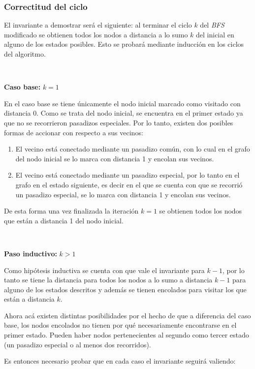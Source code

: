 	\subsubsection*{Correctitud del ciclo}

	El invariante a demostrar será el siguiente: al terminar el ciclo $k$ del
	\emph{BFS} modificado se obtienen todos los nodos a distancia a lo sumo
	$k$ del inicial en alguno de los estados posibles. Esto se probará
	mediante inducción en los ciclos del algoritmo.

	~

	\textbf{Caso base: } $k = 1$

	En el caso base se tiene únicamente el nodo inicial marcado como
	visitado con distancia 0. Como se trata del nodo inicial, se encuentra en el primer estado ya que
	no se recorrieron pasadizos especiales. Por lo tanto, existen dos posibles
	formas de accionar con respecto a sus vecinos:

	\begin{enumerate}
		\item{
			El vecino está conectado mediante un pasadizo común, con lo cual en
			el grafo del nodo inicial se lo marca con distancia 1 y encolan sus
			vecinos.
		}
		\item{
			El vecino está conectado mediante un pasadizo especial, por lo tanto
			en el grafo en el estado siguiente, es decir en el que se cuenta con
			que se recorrió un pasadizo especial, se lo marca con distancia 1 y
			encolan sus vecinos.
		}
	\end{enumerate}

	De esta forma una vez finalizada la iteración $k = 1$ se obtienen todos los
	nodos que están a distancia 1 del nodo inicial.

	~

	\textbf{Paso inductivo: } $k > 1$

	Como hipótesis inductiva se cuenta con que vale el invariante para $k - 1$,
	por lo tanto se tiene la distancia para todos los nodos a lo sumo
	a distancia $k - 1$ para alguno de los estados descritos y además se
	tienen encolados para visitar los que están a distancia $k$.

	Ahora acá existen distintas posibilidades por el hecho de que a diferencia
	del caso base, los nodos encolados no tienen por qué necesariamente
	encontrarse en el primer estado. Pueden haber nodos pertenecientes al
	segundo como tercer estado (un pasadizo especial o al menos dos recorridos).

	Es entonces necesario probar que en cada caso el invariante seguirá
	valiendo:

